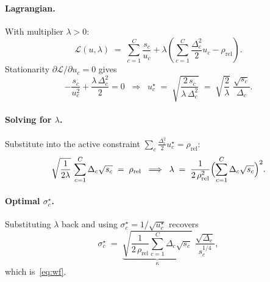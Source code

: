 \paragraph{Lagrangian.}
With multiplier $\lambda > 0$:
\begin{equation*}
\mathcal{L}(u,\lambda)
 \;=\; \sum_{c=1}^{C} \frac{s_c}{u_c}
       + \lambda\left(\sum_{c=1}^{C}\frac{\Delta_c^{2}}{2}u_c - \rho_{\mathrm{rel}}\right).
\end{equation*}
Stationarity $\partial\mathcal{L}/\partial u_c = 0$ gives
\begin{equation*}
-\frac{s_c}{u_c^{2}} + \frac{\lambda\,\Delta_c^{2}}{2} = 0
\;\;\Longrightarrow\;\;
u_c^{\star} \;=\; \sqrt{\frac{2\,s_c}{\lambda\,\Delta_c^{2}}}
\;=\; \sqrt{\frac{2}{\lambda}}\;\frac{\sqrt{s_c}}{\Delta_c}.
\end{equation*}

\paragraph{Solving for $\lambda$.}
Substitute into the active constraint
$\sum_c \tfrac{\Delta_c^{2}}{2}u_c^{\star} = \rho_{\mathrm{rel}}$:
\begin{equation*}
\sqrt{\frac{1}{2\lambda}}\,\sum_{c=1}^{C}\Delta_c\sqrt{s_c}
 \;=\; \rho_{\mathrm{rel}}
\;\;\Longrightarrow\;\;
\lambda \;=\; \frac{1}{2\,\rho_{\mathrm{rel}}^{2}}
              \Bigl(\sum_{c=1}^{C}\Delta_c\sqrt{s_c}\Bigr)^{2}.
\end{equation*}

\paragraph{Optimal $\sigma_c^{\star}$.}
Substituting $\lambda$ back and using
$\sigma_c^{\star} = 1/\sqrt{u_c^{\star}}$ recovers
\begin{equation*}
\sigma_c^{\star}
 \;=\;
 \underbrace{\sqrt{\frac{1}{2\,\rho_{\mathrm{rel}}}\sum_{c=1}^{C}\Delta_c\sqrt{s_c}}}_{\displaystyle\kappa}
 \;\frac{\sqrt{\Delta_c}}{s_c^{1/4}},
\end{equation*}
which is~\eqref{eq:wf}.

